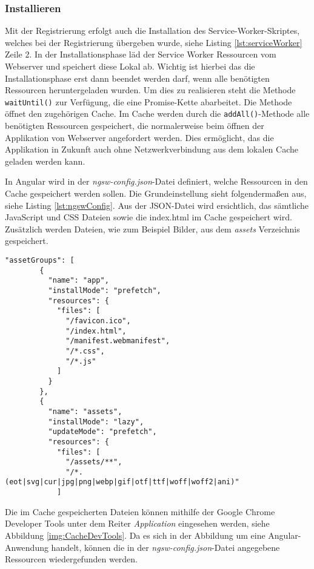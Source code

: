 \subsubsection{Installieren}

Mit der Registrierung erfolgt auch die Installation des Service-Worker-Skriptes, welches bei der Registrierung übergeben wurde, siehe Listing \ref{lst:serviceWorker} Zeile 2.
In der Installationsphase läd der Service Worker Ressourcen vom Webserver und speichert diese Lokal ab. Wichtig ist hierbei das die Installationsphase erst dann beendet werden darf, wenn alle benötigten Ressourcen heruntergeladen wurden. Um dies zu realisieren steht die Methode \texttt{waitUntil()} zur Verfügung, die eine Promise-Kette abarbeitet. Die Methode öffnet den zugehörigen Cache. Im Cache werden durch die \texttt{addAll()}-Methode alle benötigten Ressourcen gespeichert, die normalerweise beim öffnen der Applikation von Webserver angefordert werden. Dies ermöglicht, das die Applikation in Zukunft auch ohne Netzwerkverbindung aus dem lokalen Cache geladen werden kann. 

In Angular wird in der \textit{ngsw-config.json}-Datei definiert, welche Ressourcen in den Cache gespeichert werden sollen. Die Grundeinstellung sieht folgendermaßen aus, siehe Listing \ref{lst:ngswConfig}. Aus der JSON-Datei wird ersichtlich, das sämtliche JavaScript und CSS Dateien sowie die index.html im Cache gespeichert wird. Zusätzlich werden Dateien, wie zum Beispiel Bilder, aus dem \textit{assets} Verzeichnis gespeichert. 



\begin{lstlisting}[caption={Angular \textit{ngsw-config.json}- Datei zu Angabe der Ressourcen, die durch den Service Worker in den Cache gespeichert werden sollen.}, label=lst:ngswConfig, float=!htb ]
    "assetGroups": [
        {
          "name": "app",
          "installMode": "prefetch",
          "resources": {
            "files": [
              "/favicon.ico",
              "/index.html",
              "/manifest.webmanifest",
              "/*.css",
              "/*.js"
            ]
          }
        },
        {
          "name": "assets",
          "installMode": "lazy",
          "updateMode": "prefetch",
          "resources": {
            "files": [
              "/assets/**",
              "/*.(eot|svg|cur|jpg|png|webp|gif|otf|ttf|woff|woff2|ani)"
            ] 
\end{lstlisting}


Die im Cache gespeicherten Dateien können mithilfe der Google Chrome Developer Tools unter dem Reiter \textit{Application} eingesehen werden, siehe Abbildung \ref{img:CacheDevTools}. Da es sich in der Abbildung um eine Angular-Anwendung handelt, können die in der \textit{ngsw-config.json}-Datei angegebene Ressourcen wiedergefunden werden.   


